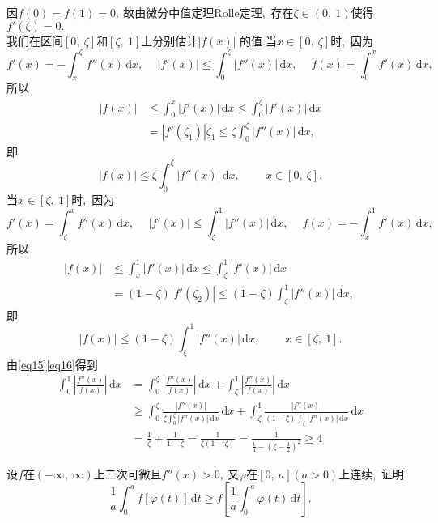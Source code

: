 	\begin{solution}
		因$f(0)=f(1)=0,\ $故由微分中值定理Rolle定理,\ 存在$\zeta \in \left(0,\ 1\right)$使得$f'(\zeta)=0.$\\
		我们在区间$\left[0,\ \zeta\right]$和$\left[\zeta,\ 1\right]$上分别估计$|f(x)|$
		的值.当$x\in \left[0,\ \zeta\right]$时,\ 因为
		$$f'(x)=-\int_{x}^{\zeta}f''(x)\,\text{d}x,\ \quad \left|f'(x)\right|\le \int_{0}^{\zeta}\left|f''(x)\right|\,\text{d}x,\ \quad f(x)=\int_{0}^{x}f'(x)\,\text{d}x,\ $$
		所以
		\begin{align*}
			\left|f(x)\right|&\le\int_{0}^{x}\left|f'(x)\right|\,\text{d}x\le \int_{0}^{\zeta}\left|f'(x)\right|\,\text{d}x\\
			&=\left|f'(\zeta_1)\right|\zeta_1\le \zeta\int_{0}^{\zeta}\left|f''(x)\right|\,\text{d}x,\ 
		\end{align*}
		即
		\begin{equation}
			\left|f(x)\right|\le \zeta\int_{0}^{\zeta}\left|f''(x)\right|\,\text{d}x,\ \qquad x\in \left[0,\ \zeta\right].\label{eq15}
		\end{equation}
		当$x\in \left[\zeta ,\ 1\right]$时,\ 因为
		$$f'(x)=\int_{\zeta}^{x}f''(x)\,\text{d}x,\ \quad \left|f'(x)\right|\le\int_{\zeta}^{1}\left|f''(x)\right|\,\text{d}x,\ \quad f(x)=-\int_{x}^{1}f'(x)\,\text{d}x,\ $$
		所以
		\begin{align*}
			\left|f(x)\right|&\le \int_{x}^{1}\left|f'(x)\right|\,\text{d}x\le\int_{\zeta}^{1}\left|f'(x)\right|\,\text{d}x\\
			&=\left(1-\zeta\right)\left|f'(\zeta_2)\right|\le \left(1-\zeta\right)\int_{\zeta}^{1}\left|f''(x)\right|\,\text{d}x,\ 
		\end{align*}
		即
		\begin{equation}
			\left|f(x)\right|\le (1-\zeta)\int_{\zeta}^{1}\left|f''(x)\right|\,\text{d}x,\ \qquad x\in\left[\zeta,\ 1\right].\label{eq16}
		\end{equation}
		由\eqref{eq15}\eqref{eq16}得到
		\begin{align*}
			\int_{0}^{1}\left|\frac{f''(x)}{f(x)}\right|\,\text{d}x&=\int_{0}^{\zeta}\left|\frac{f''(x)}{f(x)}\right|\,\text{d}x+\int_{\zeta}^{1}\left|\frac{f''(x)}{f(x)}\right|\,\text{d}x\\
			&\ge\int_{0}^{\zeta}\frac{\left|f''(x)\right|}{\zeta\int_{0}^{\zeta}\left|f''(x)\right|\,\text{d}x}\,\text{d}x+\int_{\zeta}^{1}\frac{\left|f''(x)\right|}{(1-\zeta)\int_{\zeta}^{1}\left|f''(x)\right|\,\text{d}x}\,\text{d}x\\
			&=\frac{1}{\zeta}+\frac{1}{1-\zeta}=\frac{1}{\zeta(1-\zeta)}=\frac{1}{\frac{1}{4}-\left(\zeta-\frac{1}{2}\right)^2}\ge4
		\end{align*} 
	\end{solution}
	\newpage
	\begin{problem}
		设$f$在$\left(-\infty,\ \infty\right)$上二次可微且$f''(x)>0,\ $又$\varphi$在$\left[0,\ a\right]\left(a>0\right)$上连续,\ 证明
		$$\frac{1}{a}\int_{0}^{a}f\left[\varphi\left(t\right)\right]\,\text{d}t\ge f\left[\frac{1}{a}\int_{0}^{a}\varphi\left(t\right)\,\text{d}t\right].$$
	\end{problem}
	
